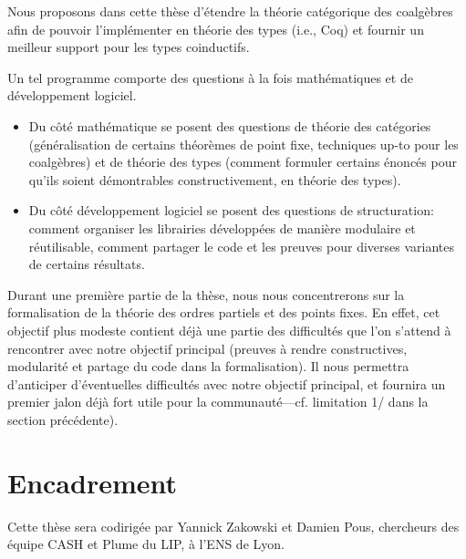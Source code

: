 \documentclass[a4paper,11pt]{article}
\begin{document}
Nous proposons dans cette thèse d'étendre la théorie catégorique des coalgèbres afin de pouvoir l'implémenter en théorie des types (i.e., Coq) et fournir un meilleur support pour les types coinductifs.

Un tel programme comporte des questions à la fois mathématiques et de développement logiciel.
\begin{itemize}
\item Du côté mathématique se posent des questions de théorie des catégories (généralisation de certains théorèmes de point fixe, techniques up-to pour les coalgèbres) et de théorie des types (comment formuler certains énoncés pour qu'ils soient démontrables constructivement, en théorie des types).
\item Du côté développement logiciel se posent des questions de structuration: comment organiser les librairies développées de manière modulaire et réutilisable, comment partager le code et les preuves pour diverses variantes de certains résultats. 
\end{itemize}

Durant une première partie de la thèse, nous nous concentrerons sur la formalisation de la théorie des ordres partiels et des points fixes. En effet, cet objectif plus modeste contient déjà une partie des difficultés que l'on s'attend à rencontrer avec notre objectif principal (preuves à rendre constructives, modularité et partage du code dans la formalisation). Il nous permettra d'anticiper d'éventuelles difficultés avec notre objectif principal, et fournira un premier jalon déjà fort utile pour la communauté---cf. limitation 1/ dans la section précédente).

\section{Encadrement}

Cette thèse sera codirigée par Yannick Zakowski et Damien Pous, chercheurs des équipe CASH et Plume du LIP, à l'ENS de Lyon.



\end{document}
